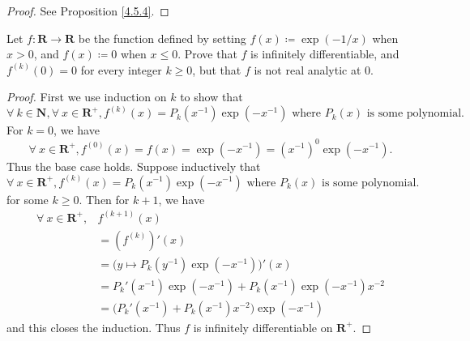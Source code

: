 \begin{proof}
    See Proposition \ref{4.5.4}.
\end{proof}

\begin{exercise}\label{ex 4.5.4}
    Let \(f : \mathbf{R} \to \mathbf{R}\) be the function defined by setting \(f(x) \coloneqq \exp(-1 / x)\) when \(x > 0\), and \(f(x) \coloneqq 0\) when \(x \leq 0\).
    Prove that \(f\) is infinitely differentiable, and \(f^{(k)}(0) = 0\) for every integer \(k \geq 0\), but that \(f\) is not real analytic at \(0\).
\end{exercise}

\begin{proof}
    First we use induction on \(k\) to show that
    \[
        \forall\ k \in \mathbf{N}, \forall\ x \in \mathbf{R}^+, f^{(k)}(x) = P_k(x^{-1}) \exp(-x^{-1}) \text{ where } P_k(x) \text{ is some polynomial}.
    \]
    For \(k = 0\), we have
    \[
        \forall\ x \in \mathbf{R}^+, f^{(0)}(x) = f(x) = \exp(-x^{-1}) = (x^{-1})^0 \exp(-x^{-1}).
    \]
    Thus the base case holds.
    Suppose inductively that
    \[
        \forall\ x \in \mathbf{R}^+, f^{(k)}(x) = P_k(x^{-1}) \exp(-x^{-1}) \text{ where } P_k(x) \text{ is some polynomial}.
    \]
    for some \(k \geq 0\).
    Then for \(k + 1\), we have
    \begin{align*}
        \forall\ x \in \mathbf{R}^+, & f^{(k + 1)}(x)                                                  \\
                                     & = (f^{(k)})'(x)                                                 \\
                                     & = \bigg(y \mapsto P_k(y^{-1}) \exp(-x^{-1})\bigg)'(x)           \\
                                     & = P_k'(x^{-1}) \exp(-x^{-1}) + P_k(x^{-1}) \exp(-x^{-1}) x^{-2} \\
                                     & = \big(P_k'(x^{-1}) + P_k(x^{-1}) x^{-2}\big) \exp(-x^{-1})
    \end{align*}
    and this closes the induction.
    Thus \(f\) is infinitely differentiable on \(\mathbf{R}^+\).


\end{proof}
